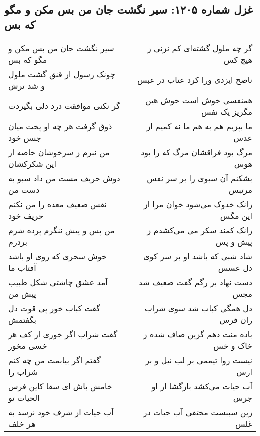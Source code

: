 \begin{center}
\section*{غزل شماره ۱۲۰۵: سیر نگشت جان من بس مکن و مگو که بس}
\label{sec:1205}
\begin{longtable}{l p{0.5cm} r}
سیر نگشت جان من بس مکن و مگو که بس
&&
گر چه ملول گشته‌ای کم نزنی ز هیچ کس
\\
چونک رسول از قنق گشت ملول و شد ترش
&&
ناصح ایزدی ورا کرد عتاب در عبس
\\
گر نکنی موافقت درد دلی بگیردت
&&
همنفسی خوش است خوش هین مگریز یک نفس
\\
ذوق گرفت هر چه او پخت میان جنس خود
&&
ما بپزیم هم به هم ما نه کمیم از عدس
\\
من نبرم ز سرخوشان خاصه از این شکرکشان
&&
مرگ بود فراقشان مرگ که را بود هوس
\\
دوش حریف مست من داد سبو به دست من
&&
بشکنم آن سبوی را بر سر نفس مرتبس
\\
نفس ضعیف معده را من نکنم حریف خود
&&
زانک خدوک می‌شود خوان مرا از این مگس
\\
من پس و پیش ننگرم پرده شرم بردرم
&&
زانک کمند سکر می می‌کشدم ز پیش و پس
\\
خوش سحری که روی او باشد آفتاب ما
&&
شاد شبی که باشد او بر سر کوی دل عسس
\\
آمد عشق چاشتی شکل طبیب پیش من
&&
دست نهاد بر رگم گفت ضعیف شد مجس
\\
گفت کباب خور پی قوت دل بگفتمش
&&
دل همگی کباب شد سوی شراب ران فرس
\\
گفت شراب اگر خوری از کف هر خسی مخور
&&
باده منت دهم گزین صاف شده ز خاک و خس
\\
گفتم اگر بیابمت من چه کنم شراب را
&&
نیست روا تیممی بر لب نیل و بر ارس
\\
خامش باش ای سقا کاین فرس الحیات تو
&&
آب حیات می‌کشد بازگشا از او جرس
\\
آب حیات از شرف خود نرسد به هر خلف
&&
زین سببست مختفی آب حیات در غلس
\\
\end{longtable}
\end{center}
